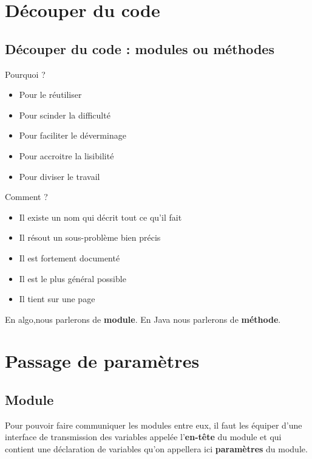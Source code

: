 \documentclass[11pt,a4paper]{article}
\begin{document}
            \section{D\'ecouper du code}\subsection{D\'ecouper du code : modules ou m\'ethodes}
      Pourquoi ?
      
					\begin{itemize}
				
			\item Pour le r\'eutiliser
			\item Pour scinder la difficult\'e
			\item Pour faciliter le d\'everminage
			\item Pour accroitre la lisibilit\'e
			\item Pour diviser le travail
					\end{itemize}
				
      Comment ?
      
					\begin{itemize}
				
			\item Il existe un nom qui d\'ecrit tout ce qu'il fait
			\item Il r\'esout un sous-probl\`eme bien pr\'ecis
			\item Il est fortement document\'e
			\item Il est le plus g\'en\'eral possible
			\item Il tient sur une page
					\end{itemize}
				
      En algo,nous parlerons de \textbf{module}.
      En Java nous parlerons de \textbf{m\'ethode}.
    \section{Passage de param\`etres}\subsection{Module}
        Pour pouvoir faire communiquer les modules entre eux, il faut les \'equiper d'une \guillemotleft  interface \guillemotright 
        de transmission des variables appel\'ee l'\textbf{en-t\^ete} du module et qui contient une d\'eclaration
        de variables qu'on appellera ici \textbf{param\`etres} du module.
      
\end{document}
